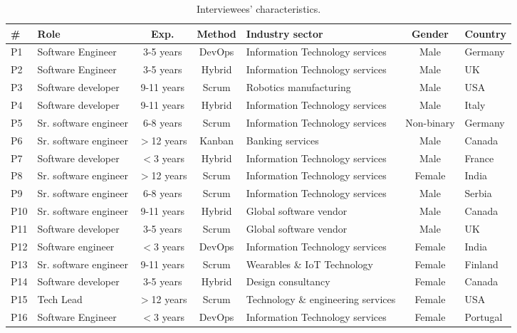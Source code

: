 \begin{table*}[t!]

  \begin{center}
    \footnotesize
    \caption{Interviewees' characteristics.}
    \label{tbl:population}
    \renewcommand\arraystretch{0.80}
        
    \begin{tabular}{l|p{2.5cm}|c|c|p{4cm}|c|p{1.1cm}}
      \hline
      \textbf{\#} & \textbf{Role} & \textbf{Exp.} & \textbf{Method} & \textbf{Industry sector} & \textbf{Gender} & \textbf{Country}\\
      \hline
    
        P1 & Software Engineer & 3-5 years & DevOps & Information Technology services & Male & Germany\\
        P2 & Software Engineer & 3-5 years & Hybrid & Information Technology services & Male & UK\\
        P3 & Software developer & 9-11 years & Scrum & Robotics manufacturing & Male & USA\\
        P4 & Software developer & 9-11 years & Hybrid & Information Technology services & Male & Italy\\
        P5 & Sr. software engineer & 6-8 years & Scrum & Information Technology services & Non-binary & Germany\\
        P6 & Sr. software engineer & $>$12 years & Kanban & Banking services & Male & Canada\\
        P7 & Software developer & $<$3 years & Hybrid & Information Technology services & Male & France\\
        P8 & Sr. software engineer & $>$12 years & Scrum & Information Technology services & Female & India\\
        P9 & Sr. software engineer & 6-8 years & Scrum & Information Technology services & Male & Serbia\\
        P10 & Sr. software engineer & 9-11 years & Hybrid & Global software vendor & Male & Canada\\
        P11 & Software developer & 3-5 years & Scrum & Global software vendor & Male & UK\\
        P12 & Software engineer & $<$3 years & DevOps & Information Technology services & Female & India\\
         \rowcolor{Gray} 
        P13 & Sr. software engineer & 9-11 years & Scrum & Wearables \& IoT Technology & Female & Finland\\
        \rowcolor{Gray} 
        P14 & Software developer & 3-5 years & Hybrid & Design consultancy & Female & Canada\\
        \rowcolor{Gray} 
        P15 & Tech Lead & $>$12 years & Scrum & Technology \& engineering services & Female & USA\\
        \rowcolor{Gray} 
        P16 & Software Engineer & $<$3 years & DevOps & Information Technology services & Female & Portugal\\
    

\end{tabular}
\end{center}
\end{table*}
